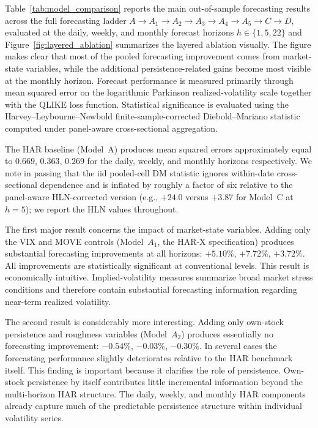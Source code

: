 \documentclass[unnumsec,webpdf,contemporary,large]{oup-authoring-template}%
\theoremstyle{thmstyleone}%
\theoremstyle{thmstyletwo}%
\theoremstyle{thmstylethree}%
\begin{document}
Table~\ref{tab:model_comparison} reports the main out-of-sample forecasting
results across the full forecasting ladder
$A\to A_1\to A_2\to A_3\to A_4\to A_5\to C\to D$, evaluated at the
daily, weekly, and monthly forecast horizons $h\in\{1,5,22\}$ and Figure~\ref{fig:layered_ablation} summarizes the layered ablation visually. The figure makes clear that most of the pooled forecasting improvement comes from market-state variables, while the additional persistence-related gains become most visible at the monthly horizon. Forecast
performance is measured primarily through mean squared error on the
logarithmic Parkinson realized-volatility scale together with the QLIKE
loss function. Statistical significance is evaluated using the
Harvey--Leybourne--Newbold finite-sample-corrected Diebold--Mariano
statistic computed under panel-aware cross-sectional aggregation.

The HAR baseline (Model~A) produces mean squared errors approximately
equal to $0.669$, $0.363$, $0.269$ for the daily, weekly, and monthly
horizons respectively. We note in passing that the iid pooled-cell DM
statistic ignores within-date cross-sectional dependence and is inflated
by roughly a factor of six relative to the panel-aware HLN-corrected
version (e.g., $+24.0$ versus $+3.87$ for Model~C at $h=5$); we report
the HLN values throughout.



The first major result concerns the impact of market-state variables.
Adding only the VIX and MOVE controls (Model~$A_1$, the HAR-X
specification) produces substantial forecasting improvements at all
horizons: $+5.10\%$, $+7.72\%$, $+3.72\%$. All improvements are
statistically significant at conventional levels. This result is
economically intuitive. Implied-volatility measures summarize broad market
stress conditions and therefore contain substantial forecasting information
regarding near-term realized volatility.

The second result is considerably more interesting. Adding only own-stock
persistence and roughness variables (Model~$A_2$) produces essentially no
forecasting improvement: $-0.54\%$, $-0.03\%$, $-0.30\%$. In several
cases the forecasting performance slightly deteriorates relative to the
HAR benchmark itself. This finding is important because it clarifies the
role of persistence. Own-stock persistence by itself contributes little
incremental information beyond the multi-horizon HAR structure. The daily,
weekly, and monthly HAR components already capture much of the predictable
persistence structure within individual volatility series.
\end{document}
